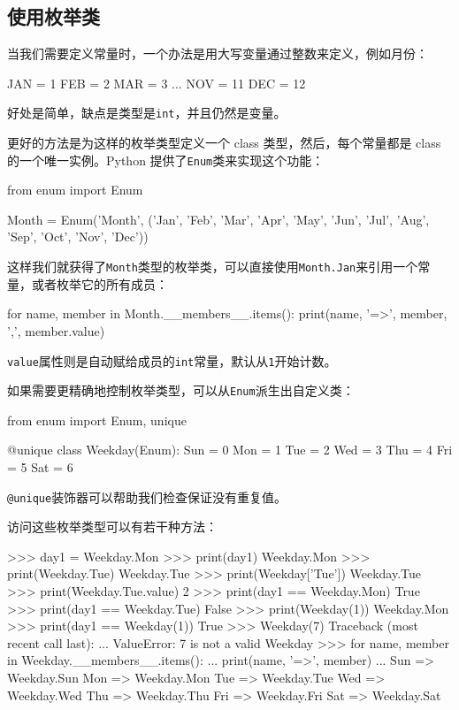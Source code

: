 \hypertarget{ux4f7fux7528ux679aux4e3eux7c7b}{%
\subsection{使用枚举类}\label{ux4f7fux7528ux679aux4e3eux7c7b}}

当我们需要定义常量时，一个办法是用大写变量通过整数来定义，例如月份：

\begin{pythoncode}
JAN = 1
FEB = 2
MAR = 3
...
NOV = 11
DEC = 12
\end{pythoncode}

好处是简单，缺点是类型是\texttt{int}，并且仍然是变量。

更好的方法是为这样的枚举类型定义一个 class 类型，然后，每个常量都是
class 的一个唯一实例。Python 提供了\texttt{Enum}类来实现这个功能：

\begin{pythoncode}
from enum import Enum

Month = Enum('Month', ('Jan', 'Feb', 'Mar', 'Apr', 'May', 'Jun', 'Jul', 'Aug', 'Sep', 'Oct', 'Nov', 'Dec'))
\end{pythoncode}

这样我们就获得了\texttt{Month}类型的枚举类，可以直接使用\texttt{Month.Jan}来引用一个常量，或者枚举它的所有成员：

\begin{pythoncode}
for name, member in Month.__members__.items():
    print(name, '=>', member, ',', member.value)
\end{pythoncode}

\texttt{value}属性则是自动赋给成员的\texttt{int}常量，默认从\texttt{1}开始计数。

如果需要更精确地控制枚举类型，可以从\texttt{Enum}派生出自定义类：

\begin{pythoncode}
from enum import Enum, unique

@unique
class Weekday(Enum):
    Sun = 0 
    Mon = 1
    Tue = 2
    Wed = 3
    Thu = 4
    Fri = 5
    Sat = 6
\end{pythoncode}

\texttt{@unique}装饰器可以帮助我们检查保证没有重复值。

访问这些枚举类型可以有若干种方法：

\begin{pythoncode}
>>> day1 = Weekday.Mon
>>> print(day1)
Weekday.Mon
>>> print(Weekday.Tue)
Weekday.Tue
>>> print(Weekday['Tue'])
Weekday.Tue
>>> print(Weekday.Tue.value)
2
>>> print(day1 == Weekday.Mon)
True
>>> print(day1 == Weekday.Tue)
False
>>> print(Weekday(1))
Weekday.Mon
>>> print(day1 == Weekday(1))
True
>>> Weekday(7)
Traceback (most recent call last):
  ...
ValueError: 7 is not a valid Weekday
>>> for name, member in Weekday.__members__.items():
...     print(name, '=>', member)
...
Sun => Weekday.Sun
Mon => Weekday.Mon
Tue => Weekday.Tue
Wed => Weekday.Wed
Thu => Weekday.Thu
Fri => Weekday.Fri
Sat => Weekday.Sat
\end{pythoncode}

